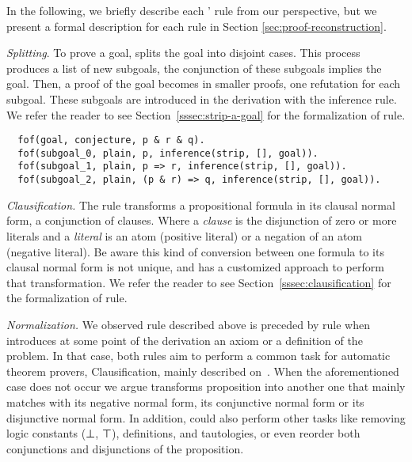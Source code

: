 In the following, we briefly describe each \Metis' rule from our perspective, but we present a formal description for each rule in Section \ref{sec:proof-reconstruction}.

\vskip 2mm


\textit{Splitting}. To prove a goal, \Metis splits the goal into
disjoint cases. This process produces a list of new subgoals, the
conjunction of these subgoals implies the goal. Then, a proof of the
goal becomes in smaller proofs, one refutation for each subgoal.
These subgoals are introduced in the \TSTP derivation with the \strip
inference rule. We refer the reader to see Section~\ref{sssec:strip-a-goal} for the formalization of \strip rule.

\begin{verbatim}
  fof(goal, conjecture, p & r & q).
  fof(subgoal_0, plain, p, inference(strip, [], goal)).
  fof(subgoal_1, plain, p => r, inference(strip, [], goal)).
  fof(subgoal_2, plain, (p & r) => q, inference(strip, [], goal)).
\end{verbatim}


\textit{Clausification.} The \clausify rule transforms a
propositional formula in its clausal normal form, a conjunction
of clauses. Where a \emph{clause} is the disjunction of zero or more
literals and a \emph{literal} is an atom (positive literal) or a
negation of an atom (negative literal). Be aware this kind of conversion between one formula to its clausal normal form is not unique, and \Metis has a customized approach to perform that transformation. We refer the reader to see Section~\ref{sssec:clausification} for the formalization of \clausify rule.

\vskip 2mm


\textit{Normalization.} We observed \clausify rule described above is
preceded by \canonicalize rule when \Metis introduces at some point of
the derivation an axiom or a definition of the problem. In that case,
both rules aim to perform a common task for automatic theorem provers,
Clausification, mainly described on~\cite{Sutcliffe1996}. When the
aforementioned case does not occur we argue \canonicalize transforms
proposition into another one that mainly matches with its negative
normal form, its conjunctive normal form or its disjunctive normal
form. In addition, \canonicalize could also perform other tasks like
removing logic constants (⊥, ⊤), definitions, and tautologies, or even
reorder both conjunctions and disjunctions of the proposition.

